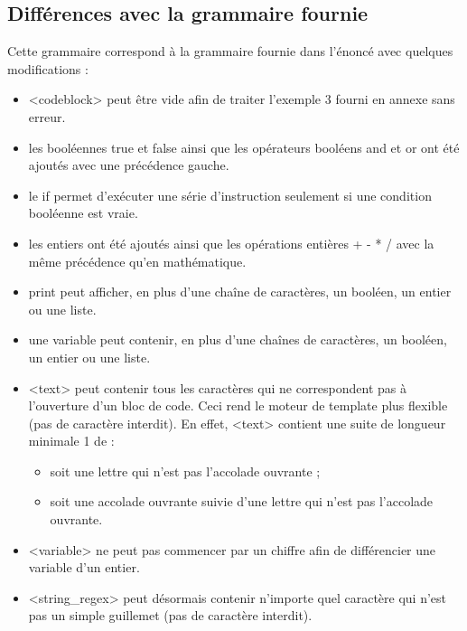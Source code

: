 \documentclass[10pt,a4paper]{article}
\begin{document}
	\subsection{Différences avec la grammaire fournie}
	Cette grammaire correspond à la grammaire fournie dans l'énoncé avec quelques modifications :
	\begin{itemize}
		\item <codeblock> peut être vide afin de traiter l'exemple 3 fourni en annexe sans erreur.
		
		\item les booléennes true et false ainsi que les opérateurs booléens and et or ont été ajoutés avec une précédence gauche.
		
		\item le if permet d'exécuter une série d'instruction seulement si une condition booléenne est vraie.
		
		\item les entiers ont été ajoutés ainsi que les opérations entières + - * / avec la même précédence qu'en mathématique.
		
		\item print peut afficher, en plus d'une chaîne de caractères, un booléen, un entier ou une liste.
		
		\item une variable peut contenir, en plus d'une chaînes de caractères, un booléen, un entier ou une liste.
		
		\item <text> peut contenir tous les caractères qui ne correspondent pas à l'ouverture d'un bloc de code.
		Ceci rend le moteur de template plus flexible (pas de caractère interdit).
		En effet, <text> contient une suite de longueur minimale 1 de :
		\begin{itemize}
			\item soit une lettre qui n'est pas l'accolade ouvrante ;
			\item soit une accolade ouvrante suivie d'une lettre qui n'est pas l'accolade ouvrante.
		\end{itemize}
		
		\item <variable> ne peut pas commencer par un chiffre afin de différencier une variable d'un entier.
		
		\item <string\_regex> peut désormais contenir n'importe quel caractère qui n'est pas un simple guillemet (pas de caractère interdit).
	\end{itemize}
	
\end{document}
